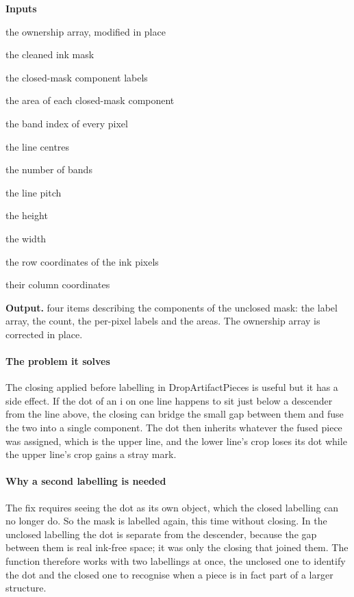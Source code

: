 \noindent\textbf{Inputs}
\begin{description}[leftmargin=2.2em,style=nextline,font=\normalfont\ttfamily]\setlength\itemsep{1pt}
  \item[{own}] \normalfont the ownership array, modified in place
  \item[{mask}] \normalfont the cleaned ink mask
  \item[{lab}] \normalfont the closed-mask component labels
  \item[{area}] \normalfont the area of each closed-mask component
  \item[{region}] \normalfont the band index of every pixel
  \item[{centres}] \normalfont the line centres
  \item[{L}] \normalfont the number of bands
  \item[{P}] \normalfont the line pitch
  \item[{H}] \normalfont the height
  \item[{W}] \normalfont the width
  \item[{ys}] \normalfont the row coordinates of the ink pixels
  \item[{xs}] \normalfont their column coordinates
\end{description}

\noindent\textbf{Output.} four items describing the components of the unclosed mask: the label array, the count, the per-pixel labels and the areas. The ownership array is corrected in place.


\paragraph{The problem it solves}
The closing applied before labelling in DropArtifactPieces is useful but it has a side effect. If the dot of an i on one line happens to sit just below a descender from the line above, the closing can bridge the small gap between them and fuse the two into a single component. The dot then inherits whatever the fused piece was assigned, which is the upper line, and the lower line's crop loses its dot while the upper line's crop gains a stray mark.


\paragraph{Why a second labelling is needed}
The fix requires seeing the dot as its own object, which the closed labelling can no longer do. So the mask is labelled again, this time without closing. In the unclosed labelling the dot is separate from the descender, because the gap between them is real ink-free space; it was only the closing that joined them. The function therefore works with two labellings at once, the unclosed one to identify the dot and the closed one to recognise when a piece is in fact part of a larger structure.


